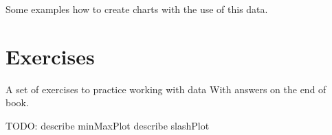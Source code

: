 Some examples how to create charts with the use of this data. 

\section{Exercises}

A set of exercises to practice working with data
With answers on the end of book.

TODO: describe minMaxPlot
describe slashPlot
